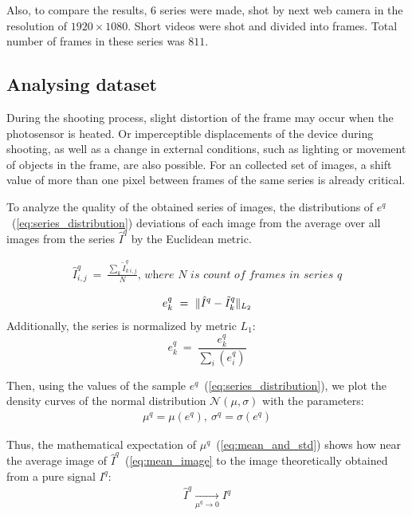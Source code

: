 \documentclass[runningheads]{llncs}
\begin{document}
Also, to compare the results, 6 series were made, shot by next web camera in the resolution of $1920\times1080$. Short videos were shot and divided into frames. Total number of frames in these series was $811$.

\subsection{Analysing dataset}
During the shooting process, slight distortion of the frame may occur when the photosensor is heated. Or imperceptible displacements of the device during shooting, as well as a change in external conditions, such as lighting or movement of objects in the frame, are also possible. For an collected set of images, a shift value of more than one pixel between frames of the same series is already critical.

To analyze the quality of the obtained series of images, the distributions of $e^q$~(\ref{eq:series_distribution}) deviations of each image from the average over all images from the series $\hat{I}^q$ by the Euclidean metric.

\begin{eqnarray}\label{eq:mean_image}
\hat{I}^q_{i,j}\ =\ \frac{\sum_{k}\tilde{I}^q_{k\ i,j}}{N}\textit{, where }N\textit{ is count of frames in series }q
\end{eqnarray}

\begin{eqnarray}\label{eq:series_distribution}
e^q_k\ =\ \Arrowvert \hat{I}^q - \tilde{I}^q_k \Arrowvert_{L_2}
\end{eqnarray}
Additionally, the series is normalized by metric $L_1$:
$$e^q_k\ =\ \frac{e^q_k}{\sum_{i}(e^q_i)}$$

Then, using the values of the sample $e^q$~(\ref{eq:series_distribution}), we plot the density curves of the normal distribution $\mathcal{N}(\mu, \sigma)$ with the parameters:
\begin{eqnarray}\label{eq:mean_and_std}
\mu^q = \mu(e^q),\ \sigma^q = \sigma(e^q)
\end{eqnarray}

Thus, the mathematical expectation of $\mu^q$~(\ref {eq:mean_and_std}) shows how near the average image of $\hat{I}^q$~(\ref{eq:mean_image}  to the image theoretically obtained from a pure signal $I^q$: 
\begin{eqnarray}\label{eq:mean_image_approximation}
\hat{I}^q \xrightarrow[\mu^q \rightarrow 0]{} I^q
\end{eqnarray}
\end{document}
